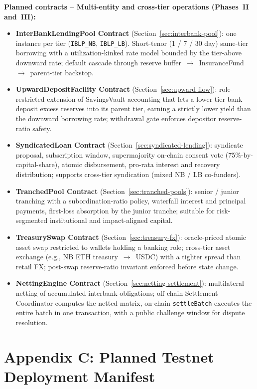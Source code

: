 \documentclass[12pt, a4paper]{report}
\begin{document}
\textbf{Planned contracts -- Multi-entity and cross-tier operations (Phases~II and~III):}
\begin{itemize}[noitemsep]
\item \textbf{InterBankLendingPool Contract} (Section~\ref{sec:interbank-pool}): one instance per tier (\texttt{IBLP\_NB}, \texttt{IBLP\_LB}). Short-tenor (1 / 7 / 30 day) same-tier borrowing with a utilization-kinked rate model bounded by the tier-above downward rate; default cascade through reserve buffer~$\to$~InsuranceFund~$\to$~parent-tier backstop.
\item \textbf{UpwardDepositFacility Contract} (Section~\ref{sec:upward-flow}): role-restricted extension of SavingsVault accounting that lets a lower-tier bank deposit excess reserves into its parent tier, earning a strictly lower yield than the downward borrowing rate; withdrawal gate enforces depositor reserve-ratio safety.
\item \textbf{SyndicatedLoan Contract} (Section~\ref{sec:syndicated-lending}): syndicate proposal, subscription window, supermajority on-chain consent vote (75\%-by-capital-share), atomic disbursement, pro-rata interest and recovery distribution; supports cross-tier syndication (mixed NB / LB co-funders).
\item \textbf{TranchedPool Contract} (Section~\ref{sec:tranched-pools}): senior / junior tranching with a subordination-ratio policy, waterfall interest and principal payments, first-loss absorption by the junior tranche; suitable for risk-segmented institutional and impact-aligned capital.
\item \textbf{TreasurySwap Contract} (Section~\ref{sec:treasury-fx}): oracle-priced atomic asset swap restricted to wallets holding a banking role; cross-tier asset exchange (e.g., NB ETH treasury~$\to$~USDC) with a tighter spread than retail FX; post-swap reserve-ratio invariant enforced before state change.
\item \textbf{NettingEngine Contract} (Section~\ref{sec:netting-settlement}): multilateral netting of accumulated interbank obligations; off-chain Settlement Coordinator computes the netted matrix, on-chain \texttt{settleBatch} executes the entire batch in one transaction, with a public challenge window for dispute resolution.
\end{itemize}

\chapter*{Appendix C: Planned Testnet Deployment Manifest}
{}
\end{document}
